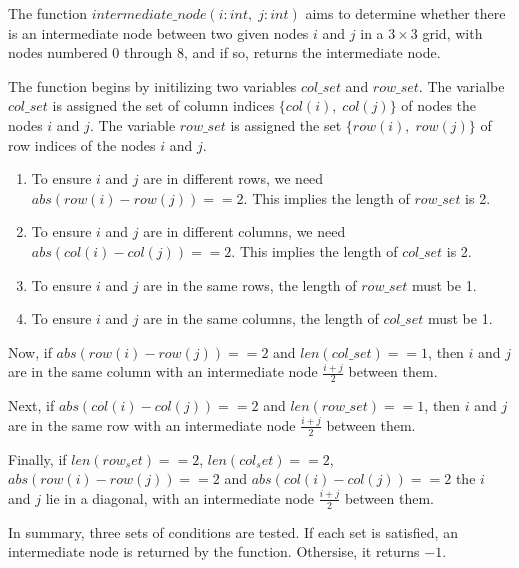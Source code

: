 \documentclass[12pt]{article}
\theoremstyle{definition}
\begin{document}
The function $intermediate\_node(i : int, \; j : int)$  aims to determine whether there is an intermediate node between two given nodes $i$ and $j$ in a $3 \times 3$ grid, with nodes numbered $0$ through $8$, and if so, 
returns the intermediate node. 

The function begins by initilizing two variables $col\_set$ and $row\_set$. The varialbe $col\_set$ is assigned the set of column indices $\{col(i),\; col(j)\}$ of nodes the nodes $i$ and $j$. 
The variable $row\_set$ is assigned the set $\{row(i),\; row(j)\}$ of row indices of the nodes $i$ and $j$. 
\begin{enumerate}
    \item To ensure $i$ and $j$ are in different rows, we need $abs(row(i)-row(j)) == 2$. This implies the length of $row\_set$ is 2. 
    \item To ensure $i$ and $j$ are in different columns, we need $abs(col(i)-col(j)) == 2$. This implies the length of $col\_set$ is 2. 
    \item To ensure $i$ and $j$ are in the same rows, the length of $row\_set$ must be 1. 
    \item To ensure $i$ and $j$ are in the same columns, the length of $col\_set$ must be 1. 
\end{enumerate}

Now, if $abs(row(i)-row(j)) == 2$ and $len(col\_set) == 1$, then $i$ and $j$ are in the same column with an intermediate node $\frac{i+j}{2}$ between them.

Next, if $abs(col(i)-col(j)) == 2$ and $len(row\_set) == 1$, then $i$ and $j$ are in the same row with an intermediate node $\frac{i+j}{2}$ between them. 

Finally, if $len(row_set) == 2$, $len(col_set) == 2$, $abs(row(i)-row(j)) == 2$ and $abs(col(i)-col(j)) == 2$ the $i$ and $j$ lie in a diagonal, with an intermediate node $\frac{i+j}{2}$ between them.

In summary, three sets of conditions are tested. If each set is satisfied, an intermediate node is returned by the function. Othersise, it returns $-1$.
\end{document}
